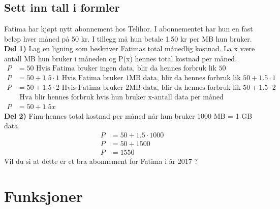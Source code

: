\documentclass[12pt,twoside,onecolumn]{article}
\begin{document}
\subsection*{Sett inn tall i formler}
\begin{Exercise}
Fatima har kjøpt nytt abonnement hos Telihor. I abonnementet har hun en fast beløp hver måned på 50 kr. I tillegg må hun betale 1.50 kr per MB hun bruker. 
\newline\newline
\textbf{Del 1)} Lag en ligning som beskriver Fatimas total månedlig kostnad. La x være antall MB hun bruker i måneden og P(x) hennes total kostnad per måned.
\begin{align}
P &= 50 \text{ Hvis Fatima bruker ingen data, blir da hennes forbruk lik 50}\\ 
P &= 50 + 1.5\cdot1\text{ Hvis Fatima bruker 1MB data, blir da hennes forbruk lik $50 + 1.5\cdot1$}\\ 
P &= 50 + 1.5\cdot2\text{ Hvis Fatima bruker 2MB data, blir da hennes forbruk lik $50 + 1.5\cdot2$}\\ 
&\text{ Hva blir hennes forbruk hvis hun bruker x-antall data per måned} \nonumber\\
P &= 50 + 1.5x
\end{align}
\newline
\textbf{Del 2)}
Finn hennes total kostnad per måned når hun bruker 1000 MB = 1 GB data.
\begin{align}
P &= 50 + 1.5\cdot1000\\
P &= 50 + 1500\\
P &= 1550
\end{align}
Vil du si at dette er et bra abonnement for Fatima i år 2017 ?
\end{Exercise}

\section*{Funksjoner}
\end{document}
